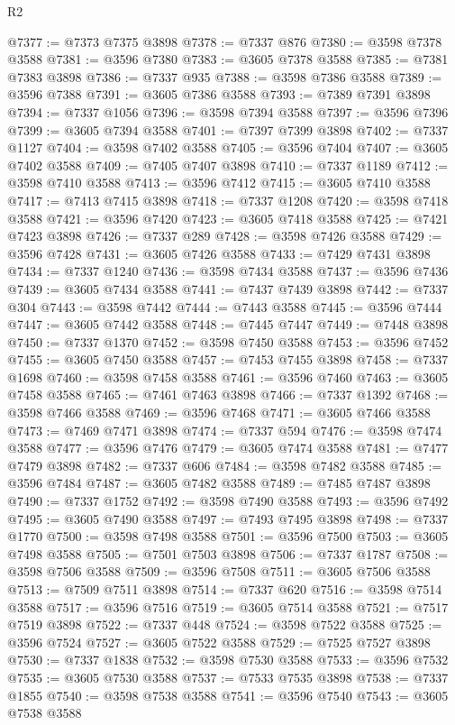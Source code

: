 \begin{lexlean}{R2}
\begin{coremodule}
@7377 := @7373 @7375 @3898
@7378 := @7337 @876
@7380 := @3598 @7378 @3588
@7381 := @3596 @7380
@7383 := @3605 @7378 @3588
@7385 := @7381 @7383 @3898
@7386 := @7337 @935
@7388 := @3598 @7386 @3588
@7389 := @3596 @7388
@7391 := @3605 @7386 @3588
@7393 := @7389 @7391 @3898
@7394 := @7337 @1056
@7396 := @3598 @7394 @3588
@7397 := @3596 @7396
@7399 := @3605 @7394 @3588
@7401 := @7397 @7399 @3898
@7402 := @7337 @1127
@7404 := @3598 @7402 @3588
@7405 := @3596 @7404
@7407 := @3605 @7402 @3588
@7409 := @7405 @7407 @3898
@7410 := @7337 @1189
@7412 := @3598 @7410 @3588
@7413 := @3596 @7412
@7415 := @3605 @7410 @3588
@7417 := @7413 @7415 @3898
@7418 := @7337 @1208
@7420 := @3598 @7418 @3588
@7421 := @3596 @7420
@7423 := @3605 @7418 @3588
@7425 := @7421 @7423 @3898
@7426 := @7337 @289
@7428 := @3598 @7426 @3588
@7429 := @3596 @7428
@7431 := @3605 @7426 @3588
@7433 := @7429 @7431 @3898
@7434 := @7337 @1240
@7436 := @3598 @7434 @3588
@7437 := @3596 @7436
@7439 := @3605 @7434 @3588
@7441 := @7437 @7439 @3898
@7442 := @7337 @304
@7443 := @3598 @7442
@7444 := @7443 @3588
@7445 := @3596 @7444
@7447 := @3605 @7442 @3588
@7448 := @7445 @7447
@7449 := @7448 @3898
@7450 := @7337 @1370
@7452 := @3598 @7450 @3588
@7453 := @3596 @7452
@7455 := @3605 @7450 @3588
@7457 := @7453 @7455 @3898
@7458 := @7337 @1698
@7460 := @3598 @7458 @3588
@7461 := @3596 @7460
@7463 := @3605 @7458 @3588
@7465 := @7461 @7463 @3898
@7466 := @7337 @1392
@7468 := @3598 @7466 @3588
@7469 := @3596 @7468
@7471 := @3605 @7466 @3588
@7473 := @7469 @7471 @3898
@7474 := @7337 @594
@7476 := @3598 @7474 @3588
@7477 := @3596 @7476
@7479 := @3605 @7474 @3588
@7481 := @7477 @7479 @3898
@7482 := @7337 @606
@7484 := @3598 @7482 @3588
@7485 := @3596 @7484
@7487 := @3605 @7482 @3588
@7489 := @7485 @7487 @3898
@7490 := @7337 @1752
@7492 := @3598 @7490 @3588
@7493 := @3596 @7492
@7495 := @3605 @7490 @3588
@7497 := @7493 @7495 @3898
@7498 := @7337 @1770
@7500 := @3598 @7498 @3588
@7501 := @3596 @7500
@7503 := @3605 @7498 @3588
@7505 := @7501 @7503 @3898
@7506 := @7337 @1787
@7508 := @3598 @7506 @3588
@7509 := @3596 @7508
@7511 := @3605 @7506 @3588
@7513 := @7509 @7511 @3898
@7514 := @7337 @620
@7516 := @3598 @7514 @3588
@7517 := @3596 @7516
@7519 := @3605 @7514 @3588
@7521 := @7517 @7519 @3898
@7522 := @7337 @448
@7524 := @3598 @7522 @3588
@7525 := @3596 @7524
@7527 := @3605 @7522 @3588
@7529 := @7525 @7527 @3898
@7530 := @7337 @1838
@7532 := @3598 @7530 @3588
@7533 := @3596 @7532
@7535 := @3605 @7530 @3588
@7537 := @7533 @7535 @3898
@7538 := @7337 @1855
@7540 := @3598 @7538 @3588
@7541 := @3596 @7540
@7543 := @3605 @7538 @3588

\end{coremodule}
\end{lexlean}
